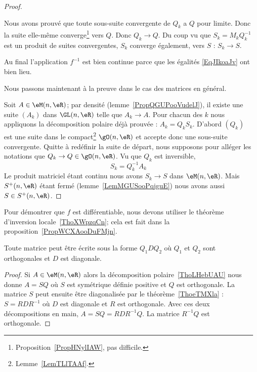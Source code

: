 \begin{proof}
\begin{subproof}
		Nous avons prouvé que toute sous-suite convergente de \( Q_k\) a \( Q\) pour limite. Donc la suite elle-même converge\footnote{Proposition~\ref{PropHNylIAW}, pas difficile.} vers \( Q\). Donc \( Q_k\to Q\). Du coup vu que \( S_k=M_kQ_k^{-1}\) est un produit de suites convergentes, \( S_k\) converge également, vers \( S\) :  \( S_k\to S\).

		Au final l'application \( f^{-1}\) est bien continue parce que les égalités \eqref{EqJIkoaJv} ont bien lieu.
	\end{subproof}

	Nous passons maintenant à la preuve dans le cas des matrices en général.

	Soit \( A\in \eM(n,\eR)\); par densité (lemme~\ref{PropQGUPooVudelJ}), il existe une suite \( (A_k)\) dans \( \GL(n,\eR)\) telle que \( A_k\to A\). Pour chacun des \( k\) nous appliquons la décomposition polaire déjà prouvée : \( A_k=Q_kS_k\). D'abord \( (Q_k)\) est une suite dans le compact\footnote{Lemme~\ref{LemTLlTAAf}.} \( \gO(n,\eR)\) et accepte donc une sous-suite convergente. Quitte à redéfinir la suite de départ, nous supposons pour alléger les notations que \( Q_k\to Q\in \gO(n,\eR)\). Vu que \( Q_k\) est inversible,
	\begin{equation}
		S_k=Q^{-1}_kA_k
	\end{equation}
	Le produit matriciel étant continu nous avons \( S_k\to S\) dans \( \eM(n,\eR)\). Mais \( S^+(n,\eR)\) étant fermé (lemme~\ref{LemMGUSooPqjguE}) nous avons aussi \( S\in S^+(n,\eR)\).
\end{proof}

\begin{remark}  \label{RemBJCBooGLiRmG}
	Pour démontrer que \( f\) est différentiable, nous devons utiliser le théorème d'inversion locale~\ref{ThoXWpzqCn}; cela est fait dans la proposition~\ref{PropWCXAooDuFMjn}.
\end{remark}

\begin{corollary}       \label{CorAWYBooNCCQSf}
	Toute matrice peut être écrite sous la forme \( Q_1DQ_2\) où \( Q_1\) et \( Q_2\) sont orthogonales et \( D\) est diagonale.
\end{corollary}

\begin{proof}
	Si \( A\in\eM(n,\eR)\) alors la décomposition polaire~\ref{ThoLHebUAU} nous donne \( A=SQ\) où \( S\) est symétrique définie positive et \( Q\) est orthogonale. La matrice \( S\) peut ensuite être diagonalisée par le théorème~\ref{ThoeTMXla} : \( S=RDR^{-1}\) où \( D\) est diagonale et \( R\) est orthogonale. Avec ces deux décompositions en main, \( A=SQ=RDR^{-1}Q\). La matrice \( R^{-1}Q\) est orthogonale.
\end{proof}

